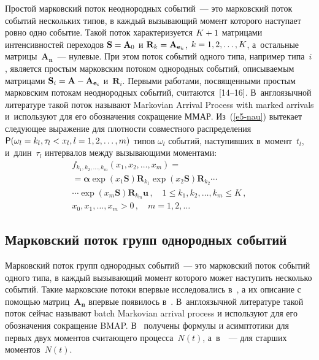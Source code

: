 \begin{multicols}{2}
  Простой марковский поток неоднородных событий~--- это марковский 
поток событий нескольких типов, в каждый вызывающий момент которого 
наступает ровно одно событие. Такой поток характеризуется $K\hm+1$ 
матрицами интенсивностей переходов $\mathbf{S}\hm= \mathbf{A}_0$ и 
$\mathbf{R}_k\hm= \mathbf{A}_{\mathbf{e}_k}$, $k\hm=1,2,\ldots ,K$, 
а~остальные матрицы~$\mathbf{A}_{\mathbf{n}}$~--- нулевые. При этом поток 
событий одного типа, например типа~$i$, является простым марковским 
потоком однородных событий, описываемым матрицами 
$\mathbf{S}_i\hm=\mathbf{A}\hm- \mathbf{A}_{\mathbf{e}_i}$ 
и~$\mathbf{R}_i$. Первыми работами, посвященными прос\-тым марковским 
потокам неоднородных событий, считаются~[14--16]. В~англоязычной 
литературе такой поток называют Markovian Arrival Process with marked arrivals 
и~используют для его обозначения сокращение ММАР.  
Из~(\ref{e5-nau}) вытекает следующее выражение для плотности совместного 
распределения ${\sf P}(\omega_l=k_l,\tau_l<x_l, l\hm=1,2,\ldots ,m)$ типов 
$\omega_l$ событий, наступивших в~момент~$t_l$, и~длин~$\tau_l$ интервалов 
между вызывающими моментами: 
  \begin{multline}
  f_{{k}_1, {k}_2, \ldots , {k}_m}\left( x_1, x_2, \ldots , x_m\right)={}\\
  {}=\bm{\alpha}\exp \left( x_1\mathbf{S}\right)\mathbf{R}_{k_1}\exp\left( 
x_2\mathbf{S}\right) \mathbf{R}_{k_2}\cdots\\
\cdots \exp \left( x_m\mathbf{S}\right) 
\mathbf{R}_{k_m}\mathbf{u}\,,\quad
 1\leq k_1, k_2, \ldots , k_m\leq K\,,\\
x_0, x_1, \ldots , x_m>0\,,\quad  m=1,2,\ldots
 \label{e9-nau}
\end{multline}

\subsection{Марковский поток групп однородных событий}

  Марковский поток групп однородных событий~--- это марковский поток 
событий одного типа, в каждый вызывающий момент которого \mbox{может} 
наступить несколько событий. Такие марковские потоки впервые 
исследовались в~\cite{8-nau, 17-nau, 18-nau}, а их описание с помощью 
матриц~$\mathbf{A}_{\mathbf{n}}$ впервые появилось в~\cite{19-nau}. 
В~англоязычной литературе такой поток сейчас называют batch Markovian 
arrival process и используют для его обозначения сокращение BMAP. 
В~\cite{20-nau} получены формулы и асимптотики для первых двух моментов 
считающего процесса~$N(t)$, а~в~\cite{21-nau}~--- для старших моментов~$N(t)$.


\end{multicols}
